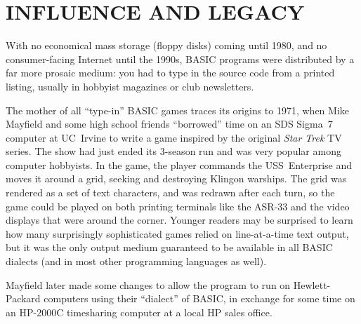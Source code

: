 

\section{INFLUENCE AND LEGACY}


With no economical mass storage (floppy disks) coming until 1980, and no
consumer-facing Internet until the 1990s, BASIC programs were
distributed by a far more prosaic medium: you had to type in the source
code from a printed listing, usually in hobbyist magazines or club
newsletters.


The mother of all ``type-in'' BASIC games traces its origins to 1971,
when Mike Mayfield and some high school friends ``borrowed'' time on
an SDS Sigma~7 computer at UC~Irvine to write a game inspired by the
original \emph{Star Trek} TV series.
The show had just ended its 3-season run and was very popular among
computer hobbyists.
In the game, the player commands the USS~Enterprise and moves it
around a grid, seeking and destroying Klingon warships.
The grid was rendered as a set of text characters, and was redrawn
after each turn, so the game could be played on both printing
terminals like the ASR-33 and the video displays that were around
the corner.
Younger readers may be surprised to learn how many surprisingly
sophisticated games relied on line-at-a-time text output, but it was the only
output medium guaranteed to be available in all BASIC dialects (and in
most other programming languages as well).

Mayfield later made some changes to allow the program to run on
Hewlett-Packard computers using their ``dialect'' of BASIC, in
exchange for some time on an HP-2000C timesharing computer at a local
HP sales office.

